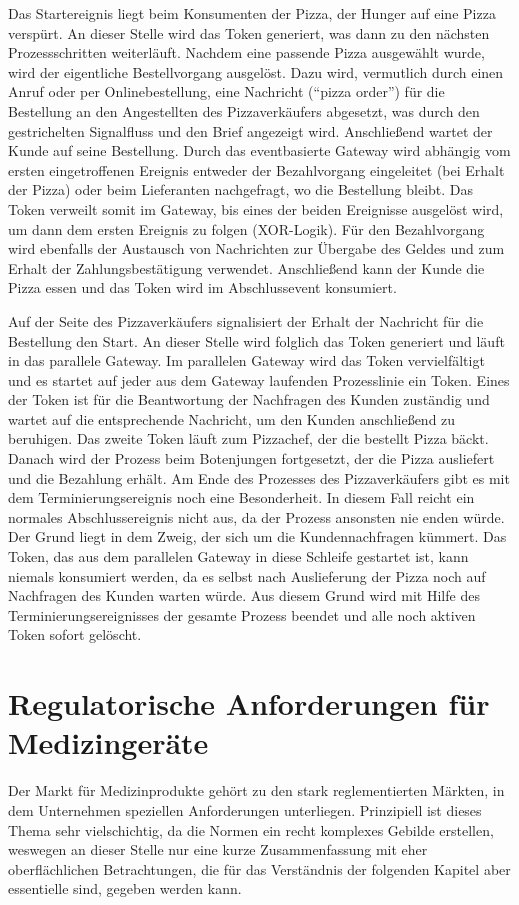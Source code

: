 \documentclass[a4paper,12pt]{report}
\begin{document}
Das Startereignis liegt beim Konsumenten der Pizza, der Hunger auf eine Pizza verspürt. An dieser Stelle wird das Token generiert, was dann zu den nächsten Prozessschritten weiterläuft. Nachdem eine passende Pizza ausgewählt wurde, wird der eigentliche Bestellvorgang ausgelöst. Dazu wird, vermutlich durch einen Anruf oder per Onlinebestellung, eine Nachricht ("`pizza order"') für die Bestellung an den Angestellten des Pizzaverkäufers abgesetzt, was durch den gestrichelten Signalfluss und den Brief angezeigt wird. Anschließend wartet der Kunde auf seine Bestellung. Durch das eventbasierte Gateway wird abhängig vom ersten eingetroffenen Ereignis entweder der Bezahlvorgang eingeleitet (bei Erhalt der Pizza) oder beim Lieferanten nachgefragt, wo die Bestellung bleibt. Das Token verweilt somit im Gateway, bis eines der beiden Ereignisse ausgelöst wird, um dann dem ersten Ereignis zu folgen (XOR-Logik). Für den Bezahlvorgang wird ebenfalls der Austausch von Nachrichten zur Übergabe des Geldes und zum Erhalt der Zahlungsbestätigung verwendet. Anschließend kann der Kunde die Pizza essen und das Token wird im Abschlussevent konsumiert.

Auf der Seite des Pizzaverkäufers signalisiert der Erhalt der Nachricht für die Bestellung den Start. An dieser Stelle wird folglich das Token generiert und läuft in das parallele Gateway. Im parallelen Gateway wird das Token vervielfältigt und es startet auf jeder aus dem Gateway laufenden Prozesslinie ein Token. Eines der Token ist für die Beantwortung der Nachfragen des Kunden zuständig und wartet auf die entsprechende Nachricht, um den Kunden anschließend zu beruhigen. Das zweite Token läuft zum Pizzachef, der die bestellt Pizza bäckt. Danach wird der Prozess beim Botenjungen fortgesetzt, der die Pizza ausliefert und die Bezahlung erhält. Am Ende des Prozesses des Pizzaverkäufers gibt es mit dem Terminierungsereignis noch eine Besonderheit. In diesem Fall reicht ein normales Abschlussereignis nicht aus, da der Prozess ansonsten nie enden würde. Der Grund liegt in dem Zweig, der sich um die Kundennachfragen kümmert. Das Token, das aus dem parallelen Gateway in diese Schleife gestartet ist, kann niemals konsumiert werden, da es selbst nach Auslieferung der Pizza noch auf Nachfragen des Kunden warten würde. Aus diesem Grund wird mit Hilfe des Terminierungsereignisses der gesamte Prozess beendet und alle noch aktiven Token sofort gelöscht.

\section{Regulatorische Anforderungen für Medizingeräte}\label{sec:RegRequ}
Der Markt für Medizinprodukte gehört zu den stark reglementierten Märkten, in dem Unternehmen speziellen Anforderungen unterliegen. Prinzipiell ist dieses Thema sehr vielschichtig, da die Normen ein recht komplexes Gebilde erstellen, weswegen an dieser Stelle nur eine kurze Zusammenfassung mit eher oberflächlichen Betrachtungen, die für das Verständnis der folgenden Kapitel aber essentielle sind, gegeben werden kann.
\end{document}
